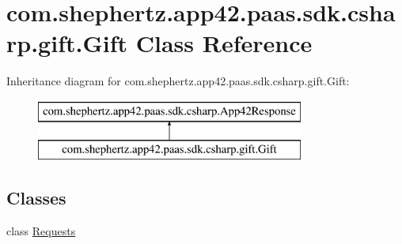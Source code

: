 \hypertarget{classcom_1_1shephertz_1_1app42_1_1paas_1_1sdk_1_1csharp_1_1gift_1_1_gift}{\section{com.\+shephertz.\+app42.\+paas.\+sdk.\+csharp.\+gift.\+Gift Class Reference}
\label{classcom_1_1shephertz_1_1app42_1_1paas_1_1sdk_1_1csharp_1_1gift_1_1_gift}
}
Inheritance diagram for com.\+shephertz.\+app42.\+paas.\+sdk.\+csharp.\+gift.\+Gift\+:\begin{figure}[H]
\begin{center}
\leavevmode
\includegraphics[height=2.000000cm]{classcom_1_1shephertz_1_1app42_1_1paas_1_1sdk_1_1csharp_1_1gift_1_1_gift}
\end{center}
\end{figure}
\subsection*{Classes}
\begin{DoxyCompactItemize}
\item 
class \hyperlink{classcom_1_1shephertz_1_1app42_1_1paas_1_1sdk_1_1csharp_1_1gift_1_1_gift_1_1_requests}{Requests}
\end{DoxyCompactItemize}
